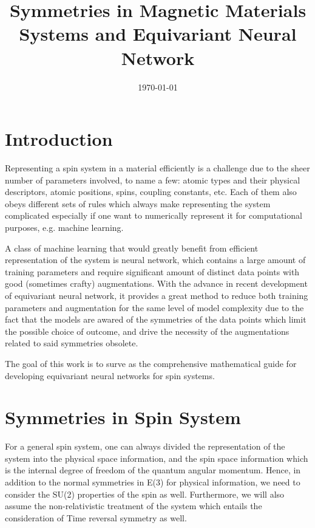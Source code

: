 \documentclass[reprint, 10pt]{revtex4-2}
\begin{document}
\title{Symmetries in Magnetic Materials Systems and Equivariant Neural Network}

\date{\today}

\maketitle
\section{Introduction}
Representing a spin system in a material efficiently is a challenge due to the sheer number of parameters involved, 
to name a few: atomic types and their physical descriptors, atomic positions, spins, coupling constants, etc. 
Each of them also obeys different sets of rules which always make representing the system complicated especially
if one want to numerically represent it for computational purposes, e.g. machine learning.

A class of machine learning that would greatly benefit from efficient representation of the system is neural network,
which contains a large amount of training parameters and require significant amount of distinct data points with 
good (sometimes crafty) augmentations. With the advance in recent development of equivariant neural network, it provides
a great method to reduce both training parameters and augmentation for the same level of model complexity due to the
fact that the models are awared of the symmetries of the data points which limit the possible choice of outcome,
and drive the necessity of the augmentations related to said symmetries obsolete.

The goal of this work is to surve as the comprehensive mathematical guide for developing equivariant neural networks 
for spin systems.

\section{Symmetries in Spin System}
For a general spin system, one can always divided the representation of the system into the physical space information,
and the spin space information which is the internal degree of freedom of the quantum angular momentum. Hence, in addition
to the normal symmetries in E(3) for physical information, we need to consider the SU(2) properties of the spin as well.
Furthermore, we will also assume the non-relativistic treatment of the system which entails the consideration of Time
reversal symmetry as well.
\end{document}

